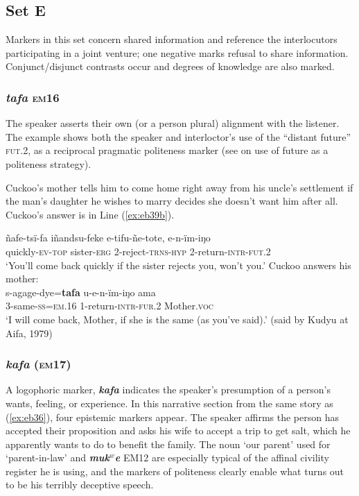 \documentclass[output=paper]{langsci/langscibook}
\begin{document}
\subsection{Set E}

Markers in this set concern shared information and reference the interlocutors participating in a joint venture; one negative marks refusal to share information. Conjunct/disjunct contrasts occur and degrees of knowledge are also marked.

\subsubsection{\textit{tafa} \textsc{em}16} 
The speaker asserts their own (or a  person plural) alignment with the listener. The example shows both the speaker and interloctor’s use of the ``distant future'' \textsc{fut}.2, as a reciprocal pragmatic politeness marker (see \citealt{Mendoza2016} on use of future as a politeness strategy).

Cuckoo’s mother tells him to come home right away from his uncle’s settlement if the man’s  daughter he wishes to marry decides she doesn’t want him after all. Cuckoo’s answer is in Line (\ref{ex:eb39b}).

\begin{exe}
\ex \label{ex:eb39}
	\begin{xlist}
	\ex \label{ex:eb39a}
	\gll ñafe-tsï-fa iñandsu-feke e-tifu-ñe-tote, e-n-ïm-iŋo\\
	quickly-\textsc{ev-top} sister-\textsc{erg} 2-reject-\textsc{trns-hyp} 2-return-\textsc{intr-fut.2}\\
	\trans ‘You’ll come back quickly if the sister rejects you, won’t you.’
	\ex Cuckoo answers his mother:\label{ex:eb39b}\\ 
	\gll s-agage-dye=\textbf{tafa} u-e-n-ïm-iŋo ama\\
	3-same-\textsc{ss=em.16} 1-return-\textsc{intr-fur.2} Mother.\textsc{voc}\\
	\trans ‘I will come back, Mother, if she is the same (as you've said).’ (said by Kudyu at Aifa, 1979)
\end{xlist}
\end{exe}

\subsubsection{\textit{kafa} (\textsc{em}17)} 
A logophoric marker, \textbf{\textit{kafa}} indicates the speaker’s presumption of a  person’s wants,  feeling, or experience.   In this narrative section from the same story as (\ref{ex:eb36}), %
four epistemic markers appear.  The speaker  affirms the  person has accepted their proposition and asks his wife to accept a trip to get salt, which he apparently wants to do to benefit the family.  The noun ‘our parent’ used for ‘parent-in-law’ and \textbf{\textit{muk$^w$e}} EM12 are especially typical of the affinal civility register he is using, and the markers of politeness clearly enable what turns out to be his terribly deceptive speech.
\end{document}

